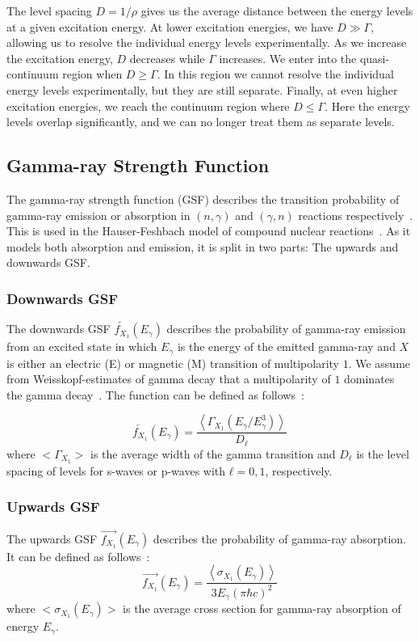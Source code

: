 \documentclass[english, notitlepage]{article}
\begin{document}
The level spacing $D = 1/ρ$ gives us the average distance between the energy levels at a given excitation energy. At lower excitation energies, we have $D ≫ Γ$, allowing us to resolve the individual energy levels experimentally. As we increase the excitation energy, $D$ decreases while $Γ$ increases. We enter into the quasi-continuum region when $D ≥ Γ$. In this region we cannot resolve the individual energy levels experimentally, but they are still separate. Finally, at even higher excitation energies, we reach the continuum region where $D ≤ Γ$. Here the energy levels overlap significantly, and we can no longer treat them as separate levels. 


\subsection{Gamma-ray Strength Function}
The gamma-ray strength function (GSF) describes the transition probability of gamma-ray emission or absorption in $(n, γ)$ and $(γ, n)$ reactions respectively~\cite{utsunomiya:2020_gamma}. This is used in the Hauser-Feshbach model of compound nuclear reactions~\cite{PhysRev.87.366}. As it models both absorption and emission, it is split in two parts: The upwards and downwards GSF. 

\subsubsection{Downwards GSF}
The downwards GSF $\overleftarrow{f_{X_1}}(E_{γ})$ describes the probability of gamma-ray emission from an excited state in which $E_γ$ is the energy of the emitted gamma-ray and $X$ is either an electric (E) or magnetic (M) transition of multipolarity $1$. We assume from Weisskopf-estimates of gamma decay that a multipolarity of $1$ dominates the gamma decay~\cite{sunniva:presentations}. The function can be defined as follows~\cite{utsunomiya:2020_gamma}:

\begin{equation}\label{eq: DGSF}
  \overleftarrow{f_{X_1}}(E_{γ}) = \frac{\left<Γ_{X_1}(E_{γ} / E^3_{γ})\right>}{D_{ℓ}}
\end{equation}
where $<Γ_{X_1}>$ is the average width of the gamma transition and $D_{ℓ}$ is the level spacing of levels for s-waves or p-waves with $ℓ = 0,1$, respectively.

\subsubsection{Upwards GSF}    
The upwards GSF $\overrightarrow{f_{X_1}}(E_{γ})$ describes the probability of gamma-ray absorption. It can be defined as follows~\cite{utsunomiya:2020_gamma}:
\begin{equation}\label{eq: UGSF}
  \overrightarrow{f_{X_1}}(E_{γ}) = \frac{\left<σ_{X_1}(E_{γ})\right>}{3E_{γ}(πℏc)^2}
\end{equation}
where $<σ_{X_1}(E_{γ})>$ is the average cross section for gamma-ray absorption of energy $E_{γ}$. 
\end{document}
